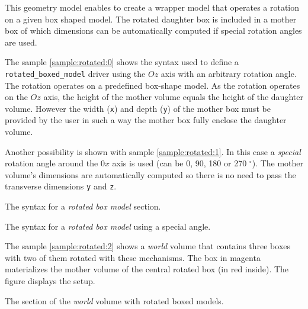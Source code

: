 This geometry model enables to  create a wrapper model that operates a
rotation  on a given  box shaped  model. The  rotated daughter  box is
included  in a  mother box  of which  dimensions can  be automatically
computed if special rotation angles are used.

The sample  \ref{sample:rotated:0} shows the  syntax used to  define a
\texttt{rotated\_boxed\_model}  driver  using the  $Oz$  axis with  an
arbitrary  rotation  angle.  The  rotation  operates  on a  predefined
box-shape model. As the rotation operates on the $Oz$ axis, the height
of the mother volume equals the height of the daughter volume. However
the width (\texttt{x})  and depth (\texttt{y}) of the  mother box must
be provided by the user in such a way the mother box fully enclose the
daughter volume.

Another  possibility is shown  with sample  \ref{sample:rotated:1}. In
this case a \emph{special} rotation angle around the $0x$ axis is used
(can be  0, 90, 180 or  270 $^{\circ}$).  The  mother volume's dimensions
are automatically computed so there  is no need to pass the transverse
dimensions \texttt{y} and \texttt{z}.

\begin{sample}[h]
\caption{The syntax for a \emph{rotated box model} section.}
\label{sample:rotated:0}
\end{sample}

\begin{sample}[h]
\caption{The  syntax for a  \emph{rotated box  model} using  a special
  angle.}
\label{sample:rotated:1}
\end{sample}

The  sample \ref{sample:rotated:2}  shows a  \emph{world}  volume that
contains three boxes  with two of them rotated  with these mechanisms.
The  box in  magenta materializes  the  mother volume  of the  central
rotated box (in red inside). The figure \label{fig:setup_5:0} displays
the setup.

\begin{sample}[h]
\caption{The section of the \emph{world} volume with rotated boxed models.}
\label{sample:rotated:2}
\end{sample}

